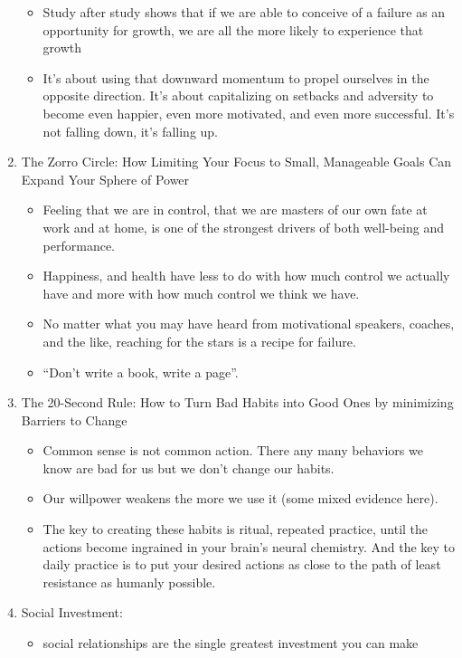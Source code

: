 \documentclass[12pt]{article}
\begin{document}
\begin{enumerate}
\begin{itemize}
\item Study after study shows that if we are able to conceive of a
  failure as an opportunity for growth, we are all the more likely to
  experience that growth
\item It’s about using that downward momentum to propel ourselves in
  the opposite direction. It’s about capitalizing on setbacks and
  adversity to become even happier, even more motivated, and even more
  successful. It’s not falling down, it’s falling up.
\end{itemize}
\item The Zorro Circle: How Limiting Your Focus to Small, Manageable
  Goals Can Expand Your Sphere of Power
\begin{itemize}
\item Feeling that we are in control, that we are masters of our own
  fate at work and at home, is one of the strongest drivers of both
  well-being and performance.
\item Happiness, and health have less to do with how much control we
  actually have and more with how much control we think we have.
\item No matter what you may have heard from motivational speakers,
  coaches, and the like, reaching for the stars is a recipe for
  failure.
\item ``Don’t write a book, write a page''.
\end{itemize}
\item The 20-Second Rule: How to Turn Bad Habits into Good Ones by
  minimizing Barriers to Change
\begin{itemize}
\item Common sense is not common action. There any many behaviors we
  know are bad for us but we don't change our habits. 
\item Our willpower weakens the more we use it (some mixed evidence
  here).
\item The key to creating these habits is ritual, repeated practice,
  until the actions become ingrained in your brain’s neural
  chemistry. And the key to daily practice is to put your desired
  actions as close to the path of least resistance as humanly
  possible.
 \end{itemize}
\item  Social Investment: 
\begin{itemize}
\item social relationships are the single greatest investment you can
  make 
\end{itemize}
\end{enumerate}
\end{document}
